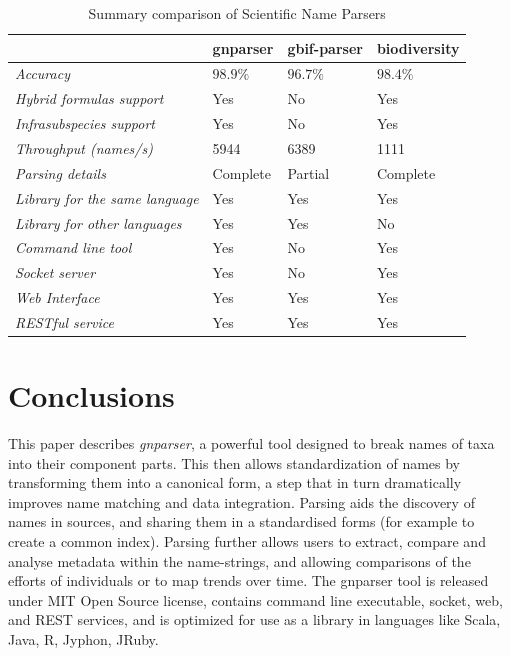 \documentclass{bmcart}
\begin{document}
\begin{table}[htb]
  \begin{center}
    \caption{Summary comparison of Scientific Name Parsers}
    \label{table:summary}
    \resizebox{12.5cm}{!} {
    \begin{tabular}{|l|*{3}{l}|}
      \hline
                             & gnparser & gbif-parser & biodiversity \\
      \hline
      \textit{Accuracy}                     & $98.9\%$ & $96.7\%$ & $98.4\%$\\
      \textit{Hybrid formulas support}      & Yes      & No       & Yes     \\
      \textit{Infrasubspecies support}      & Yes      & No       & Yes     \\
      \textit{Throughput (names/s)}         & 5944     & 6389     & 1111    \\
      \textit{Parsing details}              & Complete & Partial  & Complete\\
      \textit{Library for the same language}& Yes      & Yes      & Yes     \\
      \textit{Library for other languages}  & Yes      & Yes      & No      \\
      \textit{Command line tool}            & Yes      & No       & Yes     \\
      \textit{Socket server}                & Yes      & No       & Yes     \\
      \textit{Web Interface}                & Yes      & Yes      & Yes     \\
      \textit{RESTful service}              & Yes      & Yes      & Yes     \\
      \hline
    \end{tabular}
  }
  \end{center}
\end{table}

\section*{Conclusions}

This paper describes  \textit{gnparser}, a powerful tool designed to break names of taxa into their component parts.  This then allows standardization of names by transforming them into a canonical form, a step that in turn dramatically improves name
matching and data integration. Parsing  aids the discovery of  names in
sources, and sharing them in a standardised forms (for example to create a common index).
Parsing further allows users to extract, compare and analyse metadata within the name-strings, and allowing comparisons of the efforts of individuals or to map trends over time. The gnparser tool is released under MIT Open Source license, contains command
line executable, socket, web, and REST services, and is optimized for use as a
library in languages like Scala, Java, R, Jyphon, JRuby.
\end{document}
